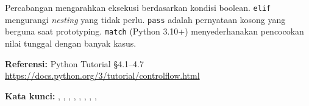 ﻿\documentclass[../main.tex]{subfiles}
\begin{document}
\begin{rangkuman}
Percabangan mengarahkan eksekusi berdasarkan kondisi boolean. \texttt{elif} mengurangi \textit{nesting} yang tidak perlu. \texttt{pass} adalah pernyataan kosong yang berguna saat prototyping. \texttt{match} (Python 3.10+) menyederhanakan pencocokan nilai tunggal dengan banyak kasus.

\textbf{Referensi:} {\small Python Tutorial §4.1--4.7 \url{https://docs.python.org/3/tutorial/controlflow.html}}

\textbf{Kata kunci:} , , , , , , , , 
\end{rangkuman}
\end{document}
